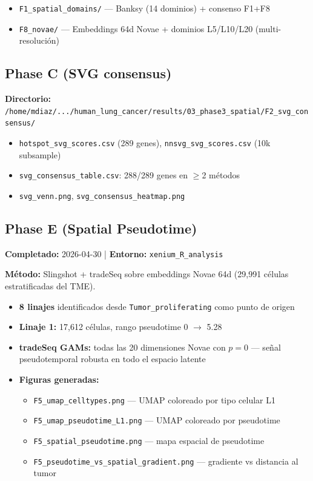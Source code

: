 \documentclass[11pt,a4paper]{article}
\begin{document}
\begin{itemize}[leftmargin=*]
\item \texttt{F1\_spatial\_domains/} --- Banksy (14 dominios) + consenso F1+F8
\item \texttt{F8\_novae/} --- Embeddings 64d Novae + dominios L5/L10/L20 (multi-resolución)
\end{itemize}

\subsection{Phase C (SVG consensus)}
\textbf{Directorio:} \texttt{\small /home/mdiaz/.../human\_lung\_cancer/results/03\_phase3\_spatial/F2\_svg\_consensus/}

\begin{itemize}[leftmargin=*]
\item \texttt{hotspot\_svg\_scores.csv} (289 genes), \texttt{nnsvg\_svg\_scores.csv} (10k subsample)
\item \texttt{svg\_consensus\_table.csv}: 288/289 genes en $\geq$2 métodos
\item \texttt{svg\_venn.png}, \texttt{svg\_consensus\_heatmap.png}
\end{itemize}

\subsection{Phase E (Spatial Pseudotime)}
\textbf{Completado:} 2026-04-30 | \textbf{Entorno:} \texttt{xenium\_R\_analysis}

\textbf{Método:} Slingshot + tradeSeq sobre embeddings Novae 64d (29,991 células estratificadas del TME).

\begin{itemize}[leftmargin=*]
\item \textbf{8 linajes} identificados desde \texttt{Tumor\_proliferating} como punto de origen
\item \textbf{Linaje 1:} 17,612 células, rango pseudotime 0 $\to$ 5.28
\item \textbf{tradeSeq GAMs:} todas las 20 dimensiones Novae con $p=0$ --- señal pseudotemporal robusta en todo el espacio latente
\item \textbf{Figuras generadas:}
  \begin{itemize}
  \item \texttt{F5\_umap\_celltypes.png} --- UMAP coloreado por tipo celular L1
  \item \texttt{F5\_umap\_pseudotime\_L1.png} --- UMAP coloreado por pseudotime
  \item \texttt{F5\_spatial\_pseudotime.png} --- mapa espacial de pseudotime
  \item \texttt{F5\_pseudotime\_vs\_spatial\_gradient.png} --- gradiente vs distancia al tumor
  \end{itemize}
\end{itemize}
\end{document}
